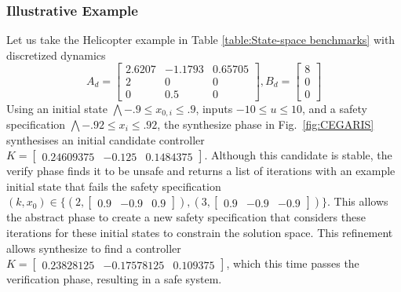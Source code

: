 \documentclass[runningheads,a4paper]{llncs}
\begin{document}
\subsubsection{Illustrative Example}
%
Let us take the Helicopter example in Table \ref{table:State-space benchmarks} with discretized dynamics
$$A_d = \left[\begin{array}{ccc}2.6207&-1.1793&0.65705\\2&0&0\\0&0.5&0\end{array}\right], B_d = \left [\begin{array}{c}8\\0\\0\end{array}\right]$$
Using an initial state $\bigwedge -.9 \leq x_{0,i} \leq .9$, inputs $-10 \leq u \leq 10$, and a safety specification $\bigwedge -.92 \leq x_i \leq .92$, the {\sc synthesize} phase in Fig.~\ref{fig:CEGARIS} synthesises an initial candidate controller $K=[\begin{array}{ccc}0.24609375&-0.125&0.1484375\end{array}]$.
Although this candidate is stable, the {\sc verify} phase finds it to be unsafe and returns a list of iterations with an example initial state that fails the safety specification
$(k,x_0) \in \{ (2, [\begin{array}{ccc}0.9&-0.9&0.9\end{array}]), (3, [\begin{array}{ccc}0.9&-0.9&-0.9\end{array}])\}$.
This allows the {\sc abstract} phase to create a new safety specification that considers these iterations for these initial states to constrain the solution space.
This refinement allows {\sc synthesize} to find a controller $K=[\begin{array}{ccc}0.23828125&-0.17578125&0.109375\end{array}]$, which this time passes the verification phase, resulting in a safe system.

\end{document}
